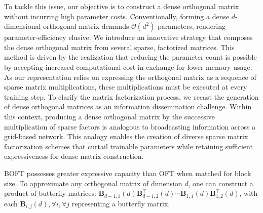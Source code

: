 To tackle this issue, our objective is to construct a dense orthogonal matrix without incurring high parameter costs. Conventionally, forming a dense $d$-dimensional orthogonal matrix demands $\mathcal{O}(d^2)$ parameters, rendering parameter-efficiency elusive. We introduce an innovative strategy that composes the dense orthogonal matrix from several sparse, factorized matrices. This method is driven by the realization that reducing the parameter count is possible by accepting increased computational cost in exchange for lower memory usage. As our representation relies on expressing the orthogonal matrix as a sequence of sparse matrix multiplications, these multiplications must be executed at every training step. To clarify the matrix factorization process, we recast the generation of dense orthogonal matrices as an information dissemination challenge. Within this context, producing a dense orthogonal matrix by the successive multiplication of sparse factors is analogous to broadcasting information across a grid-based network. This analogy enables the creation of diverse sparse matrix factorization schemes that curtail trainable parameters while retaining sufficient expressiveness for dense matrix construction.

\begin{theorem}\label{thm:exp_boft}
    BOFT possesses greater expressive capacity than OFT when matched for block size. To approximate any orthogonal matrix of dimension $d$, one can construct a product of butterfly matrices:  $\bm{B}_{d-1,1}(d)\bm{B}^\top_{d-1,2}(d)\cdots\bm{B}_{1,1}(d)\bm{B}^\top_{1,2}(d)$, with each $\bm{B}_{i,j}(d),\forall i,\forall j$ representing a butterfly matrix.
\end{theorem}

